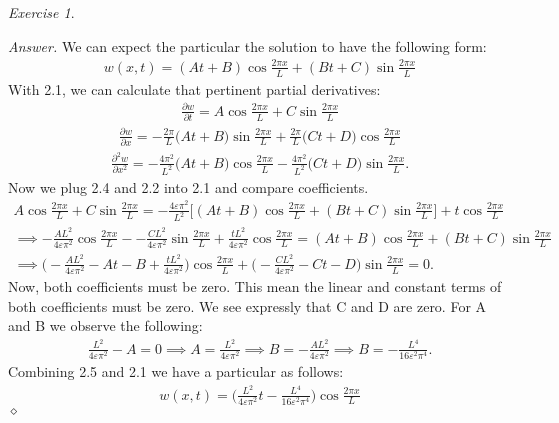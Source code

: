 \documentclass[12pt,oneside]{amsart}
\theoremstyle{definition}
\theoremstyle{remark}
\newtheorem{exer}{Exercise}
\numberwithin{equation}{exer}
\newenvironment{answer}{\bigskip\noindent\emph{Answer.}}{\hfill$\diamond$\newline}
\begin{document}
\newpage
\begin{exer}

\end{exer}
\begin{answer}
We can expect the particular the solution to have the following form:
\begin{align}
    w(x,t) = (At+B)\cos{\frac{2 \pi x}{L}}+ (Bt +C)\sin{\frac{ 2 \pi x}{L}}
\end{align}
With 2.1, we can calculate that pertinent partial derivatives:
\begin{align}
    \frac{\partial w}{\partial t} = A\cos{\frac{2 \pi x}{L}} + C\sin{\frac{2 \pi x}{L}}
\end{align}
\begin{align}
    \frac{\partial w}{\partial x} = -\frac{2 \pi}{L}\Big(At+B\Big)\sin{\frac{2 \pi x}{L}} +\frac{2 \pi}{L}\Big(Ct+D\Big)\cos{\frac{2 \pi x}{L}}
\end{align}
\begin{align}
    \frac{\partial^2 w}{\partial x^2} = -\frac{4 \pi^2}{L^2}\Big(At+B\Big)\cos{\frac{2 \pi x}{L}} - \frac{4 \pi^2}{L^2} \Big(Ct+D\Big)\sin{\frac{2 \pi x}{L}}.
\end{align}
Now we plug 2.4 and 2.2 into 2.1 and compare coefficients. 
\begin{align*}
    A\cos{\frac{2 \pi x}{L}} + C\sin{\frac{2 \pi x}{L}} = -\frac{4\varepsilon \pi^2}{L^2}\Big[(At+B)\cos{\frac{2 \pi x}{L}}+ (Bt +C)\sin{\frac{ 2 \pi x}{L}}\Big] + t\cos{\frac{2 \pi x}{L}}\\
    \implies -\frac{AL^2}{4\varepsilon\pi^2}\cos{\frac{2 \pi x}{L}} - -\frac{CL^2}{4\varepsilon\pi^2}\sin{\frac{2 \pi x}{L}}+\frac{tL^2}{4\varepsilon\pi^2}\cos{\frac{2 \pi x}{L}}= (At+B)\cos{\frac{2 \pi x}{L}}+ (Bt +C)\sin{\frac{ 2 \pi x}{L}}\\
    \implies \Bigg( -\frac{AL^2}{4\varepsilon\pi^2} - At -B + \frac{tL^2}{4\varepsilon\pi^2}\Bigg)\cos{\frac{2 \pi x}{L}} + \Bigg(-\frac{CL^2}{4\varepsilon\pi^2}-Ct-D\Bigg)\sin{\frac{2 \pi x}{L}}=0.
\end{align*}
Now, both coefficients must be zero. This mean the linear and constant terms of both coefficients must be zero. We see expressly that C and D are zero. For A and B we observe the following:
\begin{align}
    \frac{L^2}{4\varepsilon\pi^2} - A = 0 \implies A = \frac{L^2}{4\varepsilon\pi^2} 
    \implies B= -\frac{AL^2}{4\varepsilon\pi^2} \implies B = -\frac{L^4}{16\varepsilon^2\pi^4}.
\end{align}
Combining 2.5 and 2.1 we have a particular as follows:
\begin{align*}
      w(x,t) = \Big(\frac{L^2}{4\varepsilon\pi^2}t-\frac{L^4}{16\varepsilon^2\pi^4}\Big)\cos{\frac{2 \pi x}{L}}
\end{align*}
\end{answer}
\end{document}
